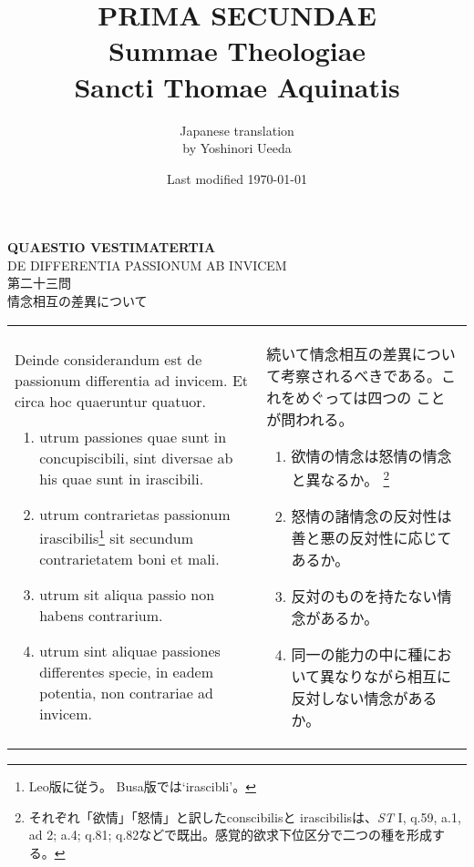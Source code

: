 \documentclass[10pt]{jsarticle} %
\title{{\bf PRIMA SECUNDAE}\\{\HUGE Summae Theologiae}\\Sancti Thomae
Aquinatis}
\author{Japanese translation\\by Yoshinori {\sc Ueeda}}
\date{Last modified \today}
\begin{document}
\maketitle
\pagestyle{fancy}


\begin{center}
 {\Large {\bf QUAESTIO VESTIMATERTIA}}\\
 {\large DE DIFFERENTIA PASSIONUM AB INVICEM}\\

 {\Large 第二十三問\\情念相互の差異について}
\end{center}

\begin{longtable}{p{21em}p{21em}}

Deinde considerandum est de passionum differentia ad invicem. Et circa
 hoc quaeruntur quatuor.

\begin{enumerate}
 \item utrum passiones quae sunt in concupiscibili, sint diversae ab his quae sunt in irascibili.
 \item utrum contrarietas passionum irascibilis\footnote{Leo版に従う。
       Busa版では`irascibli'。} sit secundum contrarietatem boni et mali.
 \item utrum sit aliqua passio non habens contrarium.
 \item utrum sint aliquae passiones differentes specie, in eadem potentia, non contrariae ad invicem.
\end{enumerate}
 
&

続いて情念相互の差異について考察されるべきである。これをめぐっては四つの
 ことが問われる。

 \begin{enumerate}
  \item 欲情の情念は怒情の情念と異なるか。
	\footnote{それぞれ「欲情」「怒情」と訳したconscibilisと
	irascibilisは、{\itshape ST} I, q.59, a.1, ad 2; a.4; q.81;
	q.82などで既出。感覚的欲求下位区分で二つの種を形成する。}
  \item 怒情の諸情念の反対性は善と悪の反対性に応じてあるか。
  \item 反対のものを持たない情念があるか。
  \item 同一の能力の中に種において異なりながら相互に反対しない情念がある
	か。
 \end{enumerate}

\end{longtable}
\end{document}
